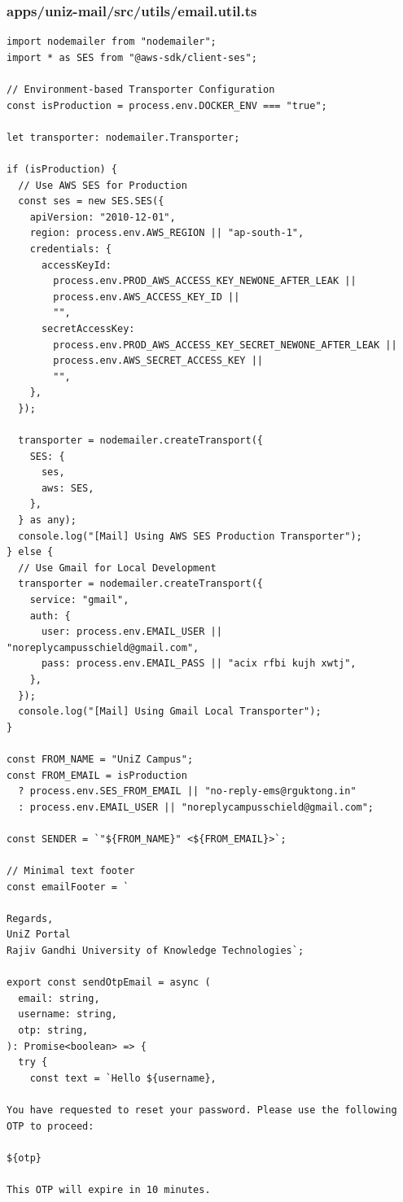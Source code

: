 \documentclass[11pt,a4paper,oneside]{article}
\begin{document}
\subsubsection*{apps/uniz-mail/src/utils/email.util.ts}
\begin{lstlisting}
import nodemailer from "nodemailer";
import * as SES from "@aws-sdk/client-ses";

// Environment-based Transporter Configuration
const isProduction = process.env.DOCKER_ENV === "true";

let transporter: nodemailer.Transporter;

if (isProduction) {
  // Use AWS SES for Production
  const ses = new SES.SES({
    apiVersion: "2010-12-01",
    region: process.env.AWS_REGION || "ap-south-1",
    credentials: {
      accessKeyId:
        process.env.PROD_AWS_ACCESS_KEY_NEWONE_AFTER_LEAK ||
        process.env.AWS_ACCESS_KEY_ID ||
        "",
      secretAccessKey:
        process.env.PROD_AWS_ACCESS_KEY_SECRET_NEWONE_AFTER_LEAK ||
        process.env.AWS_SECRET_ACCESS_KEY ||
        "",
    },
  });

  transporter = nodemailer.createTransport({
    SES: {
      ses,
      aws: SES,
    },
  } as any);
  console.log("[Mail] Using AWS SES Production Transporter");
} else {
  // Use Gmail for Local Development
  transporter = nodemailer.createTransport({
    service: "gmail",
    auth: {
      user: process.env.EMAIL_USER || "noreplycampusschield@gmail.com",
      pass: process.env.EMAIL_PASS || "acix rfbi kujh xwtj",
    },
  });
  console.log("[Mail] Using Gmail Local Transporter");
}

const FROM_NAME = "UniZ Campus";
const FROM_EMAIL = isProduction
  ? process.env.SES_FROM_EMAIL || "no-reply-ems@rguktong.in"
  : process.env.EMAIL_USER || "noreplycampusschield@gmail.com";

const SENDER = `"${FROM_NAME}" <${FROM_EMAIL}>`;

// Minimal text footer
const emailFooter = `

Regards,
UniZ Portal
Rajiv Gandhi University of Knowledge Technologies`;

export const sendOtpEmail = async (
  email: string,
  username: string,
  otp: string,
): Promise<boolean> => {
  try {
    const text = `Hello ${username},

You have requested to reset your password. Please use the following OTP to proceed:

${otp}

This OTP will expire in 10 minutes.


\end{lstlisting}
\end{document}

